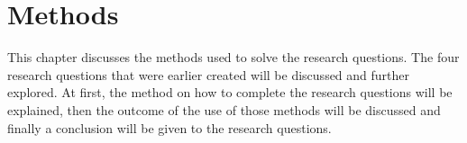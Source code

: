 \documentclass[paper=a4, fontsize=11pt,twoside]{scrartcl}	%
\begin{document}





\newpage


\section{Methods}
This chapter discusses the methods used to solve the research questions. The four research questions that were earlier created will be discussed and further explored. At first, the method on how to complete the research questions will be explained, then the outcome of the use of those methods will be discussed and finally a conclusion will be given to the research questions. 
\end{document}
